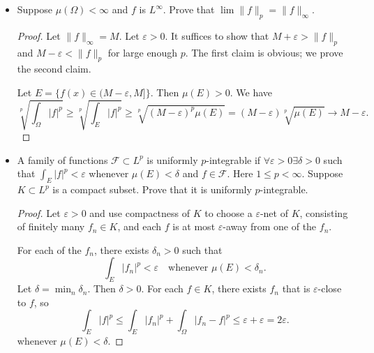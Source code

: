 \begin{itemize}
\begin{proof}
	But since the integral of absolutely integrable function is absolutely continuous, $\sum_{n=1}^{\infty} f_n$ must be absolutely continuous.
	
\end{proof}
\item Suppose $\mu(\Omega) < \infty $ and $f$ is $L^\infty $. Prove that $\lim \|f\|_p = \|f\|_\infty $.
\begin{proof}
	Let $\|f\|_\infty  = M$. Let $\varepsilon>0$. It suffices to show that $M + \varepsilon > \|f\|_p$ and $M - \varepsilon < \|f\|_p$ for large enough $p$. The first claim is obvious; we prove the second claim.
	
	Let $E = \{f(x) \in (M - \varepsilon, M]\} $. Then  $\mu(E) > 0$. We have
	\[
		\sqrt[p]{\int _\Omega |f|^p}
		\ge \sqrt[p]{\int _E |f|^p}
		\ge \sqrt[p]{(M - \varepsilon)^p \mu(E)}
		= (M - \varepsilon) \sqrt[p]{\mu(E)}  
		 \to  M - \varepsilon
	.\] 
\end{proof}
\item A family of functions $\mathcal{F} \subset L^p$ is uniformly $p$-integrable if $\forall \varepsilon>0 \exists \delta>0$ such that $\int _E |f|^p < \varepsilon$ whenever $\mu(E) < \delta$ and $f \in \mathcal{F}$.
	Here $1\le p < \infty $. Suppose $K \subset L^p$ is a compact subset. Prove that it is uniformly  $p$-integrable.
\begin{proof}
	Let $\varepsilon>0$ and use compactness of  $K$ to choose a  $\varepsilon$-net of $K$, consisting of finitely many  $f_n \in K$, and each $f$ is at most $\varepsilon$-away from one of the $f_n$.

	For each of the $f_n$, there exists $\delta_n>0$ such that
	\[
		\int _E |f_n|^p < \varepsilon\quad
		\text{whenever } \mu(E) < \delta_n
	.\] 
	Let $\delta = \min_n \delta_n$. Then $\delta>0$. For each $f \in K$, there exists $f_n$ that is $\varepsilon$-close to $f$, so
	\[
		\int_E |f|^p \le \int_E |f_n|^p + \int _\Omega |f_n - f|^p \le \varepsilon + \varepsilon = 2 \varepsilon
	.\] 
	whenever $\mu(E) < \delta$.
\end{proof}


\end{itemize}

